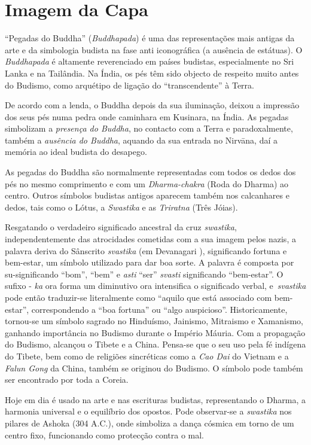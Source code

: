 \chapter{Imagem da Capa}

``Pegadas do Buddha'' (\emph{Buddhapada}) é uma das representações mais antigas
da arte e da simbologia budista na fase anti iconográfica (a ausência de
estátuas). O \emph{Buddhapada} é altamente reverenciado em países budistas,
especialmente no Sri Lanka e na Tailândia. Na Índia, os pés têm sido objecto de
respeito muito antes do Budismo, como arquétipo de ligação do ``transcendente''
à Terra.

De acordo com a lenda, o Buddha depois da sua iluminação, deixou a impressão dos
seus pés numa pedra onde caminhara em Kusinara, na Índia. As pegadas simbolizam
a \emph{presença do Buddha}, no contacto com a Terra e paradoxalmente, também a
\emph{ausência do Buddha}, aquando da sua entrada no Nirvāna, daí a memória ao
ideal budista do desapego.

As pegadas do Buddha são normalmente representadas com todos os dedos dos pés no
mesmo comprimento e com um \emph{Dharma-chakra} (Roda do Dharma) ao
centro. Outros símbolos budistas antigos aparecem também nos calcanhares e
dedos, tais como o Lótus, a \emph{Swastika} e as \emph{Triratna} (Três Jóias).

Resgatando o verdadeiro significado ancestral da cruz \emph{swastika},
independentemente das atrocidades cometidas com a sua imagem pelos nazis, a
palavra deriva do Sânscrito \emph{svastika} (em Devanagari ),
significando fortuna e bem-estar, um símbolo utilizado para dar boa sorte. A
palavra é composta por su-significando ``bom'', ``bem'' e \emph{asti} ``ser''
\emph{svasti} significando ``bem-estar''. O sufixo - \emph{ka} ora forma um
diminutivo ora intensifica o significado verbal, e~\emph{svastika} pode então
traduzir-se literalmente como ``aquilo que está associado com bem-estar'',
correspondendo a ``boa fortuna'' ou ``algo auspicioso''. Historicamente,
tornou-se um símbolo sagrado no Hinduísmo, Jainismo, Mitraismo e Xamanismo,
ganhando importância no Budismo durante o Império Máuria. Com a propagação do
Budismo, alcançou o Tibete e a China. Pensa-se que o seu uso pela fé indígena do
Tibete, bem como de religiões sincréticas como a \emph{Cao Dai} do Vietnam e a
\emph{Falun Gong} da China, também se originou do Budismo. O símbolo pode também
ser encontrado por toda a Coreia.

Hoje em dia é usado na arte e nas escrituras budistas, representando o
Dharma, a harmonia universal e o equilíbrio dos opostos. Pode observar-se
a \emph{swastika} nos pilares de Ashoka (304 A.C.), onde simboliza a dança
cósmica em torno de um centro fixo, funcionando como protecção contra o mal.
